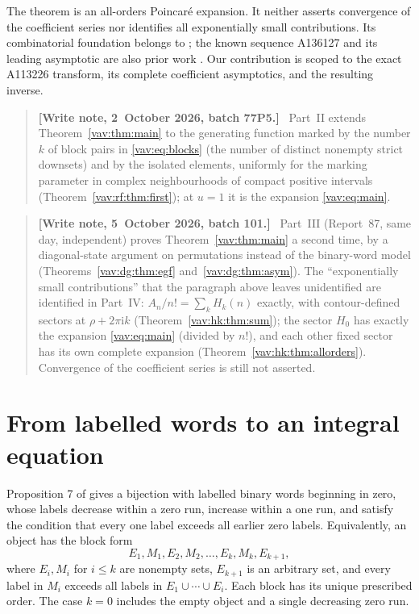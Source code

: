 \documentclass[11pt]{article}
\theoremstyle{remark}\newtheorem{remark}[theorem]{Remark}
\newcommand{\ii}{\mathrm i}
\newenvironment{writenote}{\begin{quote}\small\raggedright\textbf{[Write note, 2~October 2026, batch 77P5.]}\ }{\end{quote}}
\newenvironment{writenoteb}{\begin{quote}\small\raggedright\textbf{[Write note, 5~October 2026, batch 101.]}\ }{\end{quote}}
\begin{document}
The theorem is an all-orders Poincar\'e expansion. It neither asserts
convergence of the coefficient series nor identifies all exponentially
small contributions. Its combinatorial foundation belongs to
\cite{bck}; the known sequence A136127 and its leading asymptotic are
also prior work \cite{oeis136,aval,testart}. Our contribution is scoped
to the exact A113226 transform, its complete coefficient asymptotics,
and the resulting inverse.
\begin{writenote}
Part~II extends Theorem~\ref{vav:thm:main} to the generating function
marked by the number $k$ of block pairs in \eqref{vav:eq:blocks} (the
number of distinct nonempty strict downsets) and by the isolated elements,
uniformly for the marking parameter in complex neighbourhoods of compact
positive intervals (Theorem~\ref{vav:rf:thm:first}); at $u=1$ it is the
expansion \eqref{vav:eq:main}.
\end{writenote}
\begin{writenoteb}
Part~III (Report~87, same day, independent) proves
Theorem~\ref{vav:thm:main} a second time, by a diagonal-state argument on
permutations instead of the binary-word model
(Theorems~\ref{vav:dg:thm:egf} and~\ref{vav:dg:thm:asym}). The
``exponentially small contributions'' that the paragraph above leaves
unidentified are identified in Part~IV: $A_n/n!=\sum_kH_k(n)$ exactly, with
contour-defined sectors at $\rho+2\pi\ii k$
(Theorem~\ref{vav:hk:thm:sum}); the sector $H_0$ has exactly the expansion
\eqref{vav:eq:main} (divided by $n!$), and each other fixed sector has its
own complete expansion (Theorem~\ref{vav:hk:thm:allorders}).
Convergence of the coefficient series is still not asserted.
\end{writenoteb}

\section{From labelled words to an integral equation}\label{vav:sec:transfer}

Proposition 7 of \cite{bck} gives a bijection with labelled binary words
beginning in zero, whose labels decrease within a zero run, increase
within a one run, and satisfy the condition that every one label exceeds
all earlier zero labels. Equivalently, an object has the block form
\begin{equation}\label{vav:eq:blocks}
 E_1,M_1,E_2,M_2,\ldots,E_k,M_k,E_{k+1},
\end{equation}
where $E_i,M_i$ for $i\le k$ are nonempty sets, $E_{k+1}$ is an
arbitrary set, and every label in $M_i$ exceeds all labels in
$E_1\cup\cdots\cup E_i$. Each block has its unique prescribed order.
The case $k=0$ includes the empty object and a single decreasing zero run.
\end{document}
